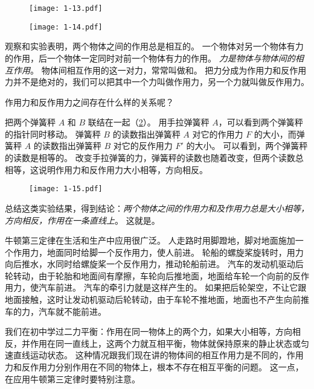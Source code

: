 \begin{figure}
  \texttt{[image: 1-13.pdf]}
  \caption{}\label{fig:1-13}
  \texttt{[image: 1-14.pdf]}
  \caption{}\label{fig:1-14}
\end{figure}

观察和实验表明，两个物体之间的作用总是相互的。
一个物体对另一个物体有力的作用，后一个物体一定同时对前一个物体有力的作用。
\emph{力是物体与物体间的相互作用}。
物体间相互作用的这一对力，常常叫做和。
把力分成为作用力和反作用力并不是绝对的，我们可以把其中一个力叫做作用力，另一个力就叫做反作用力。

作用力和反作用力之间存在什么样的关系呢？

把两个弹簧秤 $A$ 和 $B$ 联结在一起（\cref{fig:1-15}）。
用手拉弹簧秤 $A$，可以看到两个弹簧秤的指针同时移动。
弹簧秤 $B$ 的读数指出弹簧秤 $A$ 对它的作用力 $F$ 的大小，而弹簧秤 $A$ 的读数指出弹簧秤 $B$ 对它的反作用力 $F'$ 的大小。
可以看到，两个弹簧秤的读数是相等的。
改变手拉弹簧的力，弹簧秤的读数也随着改变，但两个读数总相等，这说明作用力和反作用力大小相等，方向相反。

\begin{figure}
  \texttt{[image: 1-15.pdf]}
  \caption{}\label{fig:1-15}
\end{figure}

总结这类实验结果，得到结论：\emph{两个物体之间的作用力和及作用力总是大小相等，方向相反，作用在一条直线上}。
这就是。

牛顿第三定律在生活和生产中应用很广泛。
人走路时用脚蹬地，脚对地面施加一个作用力，地面同时给脚一个反作用力，使人前进。
轮船的螺旋桨旋转时，用力向后推水，水同时给螺旋桨一个反作用力，推动轮船前进。
汽车的发动机驱动后轮转动，由于轮胎和地面间有摩擦，车轮向后推地面，地面给车轮一个向前的反作用力，使汽车前进。
汽车的牵引力就是这样产生的。
如果把后轮架空，不让它跟地面接触，这时让发动机驱动后轮转动，由于车轮不推地面，地面也不产生向前推车的力，汽车就不能前进。

我们在初中学过二力平衡：作用在同一物体上的两个力，如果大小相等，方向相反，并作用在同一直线上，这两个力就互相平衡，物体就保持原来的静止状态或匀速直线运动状态。
这种情况跟我们现在讲的物体间的相互作用力是不同的，作用力和反作用力分别作用在不同的物体上，根本不存在相互平衡的问题。
这一点，在应用牛顿第三定律时要特别注意。

